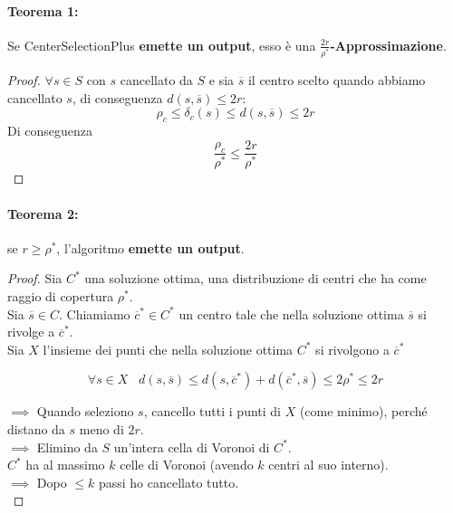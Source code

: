 \documentclass[11pt]{article}
\begin{document}
	\newpage
	
	\paragraph{Teorema 1:} Se CenterSelectionPlus \textbf{emette un output}, esso è una \textbf{$\frac{2r}{\rho^\ast}$-Approssimazione}.
	
	\begin{proof}
		$\forall s \in S$ con $s$ cancellato da $S$ e sia $\overline{s}$ il centro scelto quando abbiamo cancellato $s$, di conseguenza $d(s, \overline{s}) \leq 2r$:
		$$\rho_c \leq \delta_c (s) \leq d(s, \overline{s}) \leq 2r $$
		Di conseguenza
		$$ \frac{\rho_c}{\rho^\ast} \leq \frac{2r}{\rho^\ast}$$
	\end{proof}
	
	\paragraph{Teorema 2:} se $r \geq \rho^\ast$, l'algoritmo \textbf{emette un output}.\\
	
	\begin{proof}
		Sia $C^\ast$ una soluzione ottima, una distribuzione di centri che ha come raggio di copertura $\rho^\ast$.  \\
		Sia $\overline{s} \in C$. Chiamiamo $\overline{c}^\ast \in C^\ast$ un centro tale che nella soluzione ottima $\overline{s}$ si rivolge a $\overline{c}^\ast$.\\
		Sia $X$ l'insieme dei punti che nella soluzione ottima $C^\ast$ si rivolgono a $\overline{c}^\ast$
		
		$$ \forall s \in X \;\;\; d(s, \overline{s}) \leq d(s, \overline{c}^\ast) + d(\overline{c}^\ast, \overline{s}) \leq 2 \rho^\ast \leq 2r $$
		
		$\implies$ Quando seleziono $s$, cancello tutti i punti di $X$ (come minimo), perché distano da $s$ meno di $2r$.\\
		$\implies$ Elimino da $S$ un'intera cella di Voronoi di $C^\ast$.\\
		
		$C^\ast$ ha al massimo $k$ celle di Voronoi (avendo $k$ centri al suo interno).\\
		$\implies$ Dopo $\leq k$ passi ho cancellato tutto.\\
	\end{proof}
	
\end{document}
